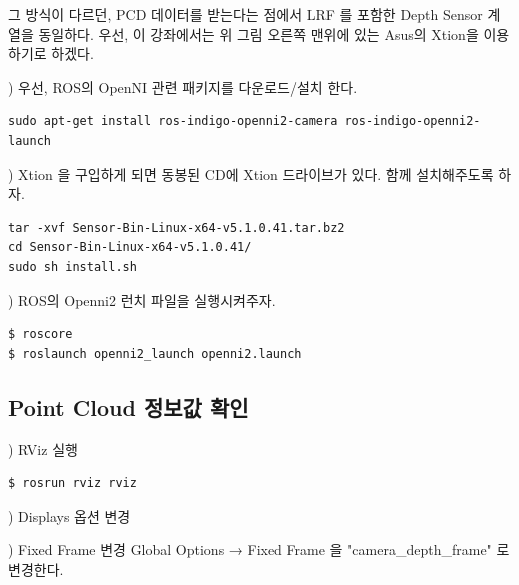 그 방식이 다르던, PCD 데이터를 받는다는 점에서 LRF 를 포함한 Depth Sensor 계열을 동일하다. 우선, 이 강좌에서는 위 그림 오른쪽 맨위에 있는 Asus의 Xtion을 이용하기로 하겠다. 

\setcounter{num}{0}

\vspace{\baselineskip}
\noindent
{}
\thenum) 우선, ROS의 OpenNI 관련 패키지를 다운로드/설치 한다.

\begin{lstlisting}[language=ROS]
sudo apt-get install ros-indigo-openni2-camera ros-indigo-openni2-launch
\end{lstlisting}

\vspace{\baselineskip}
\noindent
{}
\thenum) Xtion 을 구입하게 되면 동봉된 CD에 Xtion 드라이브가 있다. 함께 설치해주도록 하자.

\begin{lstlisting}[language=ROS]
tar -xvf Sensor-Bin-Linux-x64-v5.1.0.41.tar.bz2
cd Sensor-Bin-Linux-x64-v5.1.0.41/
sudo sh install.sh 
\end{lstlisting}

\vspace{\baselineskip}
\noindent
{}
\thenum) ROS의 Openni2 런치 파일을 실행시켜주자.

\begin{lstlisting}[language=ROS]
$ roscore
$ roslaunch openni2_launch openni2.launch
\end{lstlisting}

\subsection{Point Cloud 정보값 확인}

\setcounter{num}{0}

\thenum) RViz 실행

\begin{lstlisting}[language=ROS]
$ rosrun rviz rviz
\end{lstlisting}

\vspace{\baselineskip}
\noindent
{}
\thenum) Displays 옵션 변경

\vspace{\baselineskip}
\noindent
{}) Fixed Frame 변경
Global Options → Fixed Frame 을 "camera\_depth\_frame" 로 변경한다.

